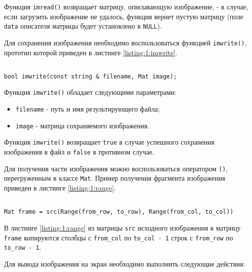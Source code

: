 Функция \verb|imread()| возвращает матрицу, описывающую изображение, - в случае, если загрузить изображение не удалось, функция вернет пустую матрицу (поле \verb|data| описателя матрицы будет установлено в \verb|NULL|).

Для сохранения изображения необходимо воспользоваться функцией \verb|imwrite()|, прототип которой приведен в листинге \ref{listing:1:imwrite}.

\begin{lstlisting}

bool imwrite(const string & filename, Mat image);

\end{lstlisting}
\mylistingend

Функция \verb|imwrite()| обладает следующими параметрами:

\begin{itemize}

	\item \verb|filename| - путь и имя результирующего файла;
	\item \verb|image| - матрица сохраняемого изображения.

\end{itemize}

Функция \verb|imwrite()| возвращает \verb|true| в случае успешного сохранения изображения в файл и \verb|false| в противном случае.


Для получения части изображения можно воспользоваться оператором \verb|()|, перегруженным в классе \verb|Mat|. Пример получения фрагмента изображения приведен в листинге \ref{listing:1:range}.

\begin{lstlisting}

Mat frame = src(Range(from_row, to_row), Range(from_col, to_col))

\end{lstlisting}
\mylistingend

В листинге \ref{listing:1:range} из матрицы \verb|src| исходного изображения в матрицу \verb|frame| копируются столбцы с \verb|from_col| по \verb|to_col - 1| строк с \verb|from_row| по \verb|to_row - 1|.


Для вывода изображения на экран необходимо выполнить следующие действия:

